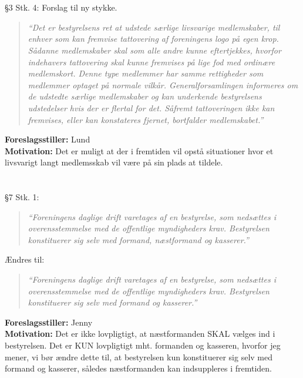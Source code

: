 \documentclass[a4paper,12pt,danish]{article}
\newcommand\cit[1]{
    \begin{quote}
        \textit{``#1''}
    \end{quote}
}
\newcommand\who[1]{
    \textbf{Foreslagsstiller:} #1\\
}
\newcommand\why[1]{
    \textbf{Motivation:} #1\\
}
\newcommand\change[1]{
    \section{}
    #1
}
\begin{document}
\change{
	\S3 Stk. 4:
Forslag til ny stykke.
    \cit{Det er bestyrelsens ret at udstede særlige livsvarige medlemskaber, til enhver som kan fremvise tattovering af foreningens logo på egen krop. Sådanne medlemskaber skal som alle andre kunne eftertjekkes, hvorfor indehavers tattovering skal kunne fremvises på lige fod med ordinære medlemskort. Denne type medlemmer har samme rettigheder som medlemmer optaget på normale vilkår. Generalforsamlingen informeres om de udstedte særlige medlemskaber og kan underkende bestyrelsens udstedelser hvis der er flertal for det. Såfremt tattoveringen ikke kan fremvises, eller kan konstateres fjernet, bortfalder medlemskabet.}
    \who{Lund}
    \why{Det er muligt at der i fremtiden vil opstå situationer hvor et livsvarigt langt medlemsskab vil være på sin plads at tildele.}
}

\change{
	\S7 Stk. 1:
    \cit{Foreningens daglige drift varetages af en bestyrelse, som nedsættes i overensstemmelse med de offentlige myndigheders krav. Bestyrelsen konstituerer sig selv med formand, næstformand og kasserer.}
    Ændres til:
    \cit{Foreningens daglige drift varetages af en bestyrelse, som nedsættes i overensstemmelse med de offentlige myndigheders krav. Bestyrelsen konstituerer sig selv med formand og kasserer.}
    \who{Jenny}
    \why{Det er ikke lovpligtigt, at næstformanden SKAL vælges ind i bestyrelsen. Det er KUN lovpligtigt mht. formanden og kasseren, hvorfor jeg mener, vi bør ændre dette til, at bestyrelsen kun konstituerer sig selv med formand og kasserer, således næstformanden kan indsuppleres i fremtiden.}
}
\end{document}
